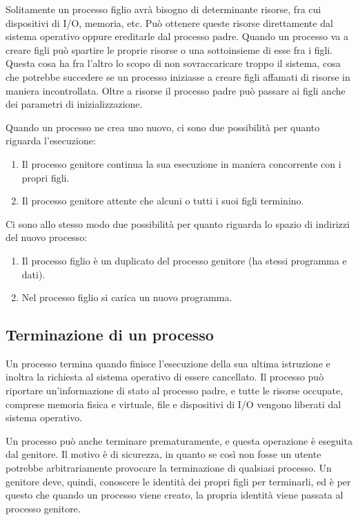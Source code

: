         Solitamente un processo figlio avrà bisogno di determinante risorse, fra cui dispositivi di I/O, memoria, etc. Può ottenere queste risorse direttamente dal sistema operativo oppure ereditarle dal processo padre. Quando un processo va a creare figli può spartire le proprie risorse o una sottoinsieme di esse fra i figli. Questa cosa ha fra l'altro lo scopo di non sovraccaricare troppo il sistema, cosa che potrebbe succedere se un processo iniziasse a creare figli affamati di risorse in maniera incontrollata. Oltre a risorse il processo padre può passare ai figli anche dei parametri di inizializzazione.
        
        Quando un processo ne crea uno nuovo, ci sono due possibilità per quanto riguarda l'esecuzione:
        \begin{enumerate}
            \item Il processo genitore continua la sua esecuzione in maniera concorrente con i propri figli.
            \item Il processo genitore attente che alcuni o tutti i suoi figli terminino.
        \end{enumerate}
        
        Ci sono allo stesso modo due possibilità per quanto riguarda lo spazio di indirizzi del nuovo processo:
        \begin{enumerate}
            \item Il processo figlio è un duplicato del processo genitore (ha stessi programma e dati).
            \item Nel processo figlio si carica un nuovo programma.
        \end{enumerate}
        
    \subsection{Terminazione di un processo}
        Un processo termina quando finisce l'esecuzione della sua ultima istruzione e inoltra la richiesta al sistema operativo di essere cancellato. Il processo può riportare un'informazione di stato al processo padre, e tutte le risorse occupate, comprese memoria fisica e virtuale, file e dispositivi di I/O vengono liberati dal sistema operativo.
        
        Un processo può anche terminare prematuramente, e questa operazione è eseguita dal genitore. Il motivo è di sicurezza, in quanto se così non fosse un utente potrebbe arbitrariamente provocare la terminazione di qualsiasi processo. Un genitore deve, quindi, conoscere le identità dei propri figli per terminarli, ed è per questo che quando un processo viene creato, la propria identità viene passata al processo genitore.
        
